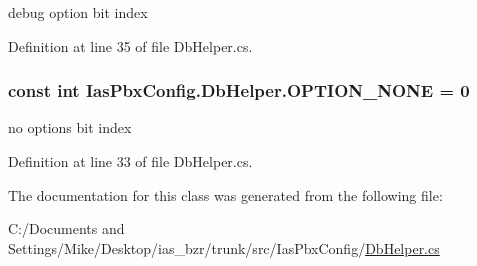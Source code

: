 debug option bit index 

Definition at line 35 of file DbHelper.cs.\hypertarget{class_ias_pbx_config_1_1_db_helper_a579e32b9a71d8f601e01d6b5a1f98022}{
\subsubsection[{OPTION\_\-NONE}]{\setlength{\rightskip}{0pt plus 5cm}const int {\bf IasPbxConfig.DbHelper.OPTION\_\-NONE} = 0}}
\label{class_ias_pbx_config_1_1_db_helper_a579e32b9a71d8f601e01d6b5a1f98022}


no options bit index 

Definition at line 33 of file DbHelper.cs.

The documentation for this class was generated from the following file:\begin{DoxyCompactItemize}
\item 
C:/Documents and Settings/Mike/Desktop/ias\_\-bzr/trunk/src/IasPbxConfig/\hyperlink{_db_helper_8cs}{DbHelper.cs}\end{DoxyCompactItemize}
